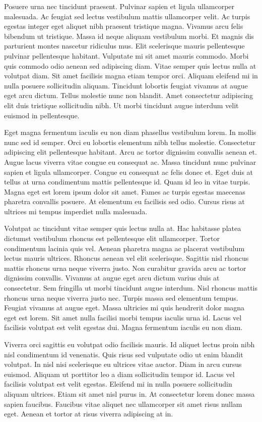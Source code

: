 \documentclass[12pt,ngerman,a4paper,oneside,,tablecaptionabove]{scrbook}
\begin{document}
Posuere urna nec tincidunt praesent. Pulvinar sapien et ligula
ullamcorper malesuada. Ac feugiat sed lectus vestibulum mattis
ullamcorper velit. Ac turpis egestas integer eget aliquet nibh praesent
tristique magna. Vivamus arcu felis bibendum ut tristique. Massa id
neque aliquam vestibulum morbi. Et magnis dis parturient montes nascetur
ridiculus mus. Elit scelerisque mauris pellentesque pulvinar
pellentesque habitant. Vulputate mi sit amet mauris commodo. Morbi quis
commodo odio aenean sed adipiscing diam. Vitae semper quis lectus nulla
at volutpat diam. Sit amet facilisis magna etiam tempor orci. Aliquam
eleifend mi in nulla posuere sollicitudin aliquam. Tincidunt lobortis
feugiat vivamus at augue eget arcu dictum. Tellus molestie nunc non
blandit. Amet consectetur adipiscing elit duis tristique sollicitudin
nibh. Ut morbi tincidunt augue interdum velit euismod in pellentesque.

Eget magna fermentum iaculis eu non diam phasellus vestibulum lorem. In
mollis nunc sed id semper. Orci eu lobortis elementum nibh tellus
molestie. Consectetur adipiscing elit pellentesque habitant. Arcu ac
tortor dignissim convallis aenean et. Augue lacus viverra vitae congue
eu consequat ac. Massa tincidunt nunc pulvinar sapien et ligula
ullamcorper. Congue eu consequat ac felis donec et. Eget duis at tellus
at urna condimentum mattis pellentesque id. Quam id leo in vitae turpis.
Magna eget est lorem ipsum dolor sit amet. Fames ac turpis egestas
maecenas pharetra convallis posuere. At elementum eu facilisis sed odio.
Cursus risus at ultrices mi tempus imperdiet nulla malesuada.

Volutpat ac tincidunt vitae semper quis lectus nulla at. Hac habitasse
platea dictumst vestibulum rhoncus est pellentesque elit ullamcorper.
Tortor condimentum lacinia quis vel. Aenean pharetra magna ac placerat
vestibulum lectus mauris ultrices. Rhoncus aenean vel elit scelerisque.
Sagittis nisl rhoncus mattis rhoncus urna neque viverra justo. Non
curabitur gravida arcu ac tortor dignissim convallis. Vivamus at augue
eget arcu dictum varius duis at consectetur. Sem fringilla ut morbi
tincidunt augue interdum. Nisl rhoncus mattis rhoncus urna neque viverra
justo nec. Turpis massa sed elementum tempus. Feugiat vivamus at augue
eget. Massa ultricies mi quis hendrerit dolor magna eget est lorem. Sit
amet nulla facilisi morbi tempus iaculis urna id. Lacus vel facilisis
volutpat est velit egestas dui. Magna fermentum iaculis eu non diam.

Viverra orci sagittis eu volutpat odio facilisis mauris. Id aliquet
lectus proin nibh nisl condimentum id venenatis. Quis risus sed
vulputate odio ut enim blandit volutpat. In nisl nisi scelerisque eu
ultrices vitae auctor. Diam in arcu cursus euismod. Aliquam ut porttitor
leo a diam sollicitudin tempor id. Lacus vel facilisis volutpat est
velit egestas. Eleifend mi in nulla posuere sollicitudin aliquam
ultrices. Etiam sit amet nisl purus in. At consectetur lorem donec massa
sapien faucibus. Faucibus vitae aliquet nec ullamcorper sit amet risus
nullam eget. Aenean et tortor at risus viverra adipiscing at in.
\end{document}
